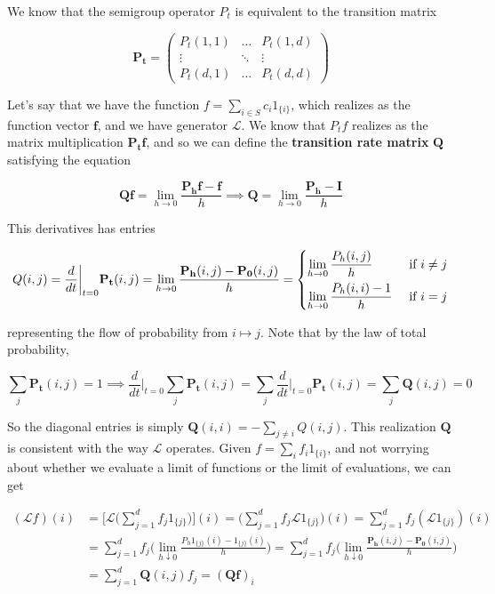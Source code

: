 \documentclass{article}
\begin{document}
    \begin{example}
      We know that the semigroup operator $P_t$ is equivalent to the transition matrix 

        \[\mathbf{P_t} = \begin{pmatrix} P_t (1, 1) & \ldots & P_t (1, d) \\ \vdots & \ddots & \vdots \\ P_t (d, 1) & \ldots & P_t (d, d) \end{pmatrix}\]

      Let's say that we have the function $f = \sum_{i \in S} c_i 1_{\{i\}}$, which realizes as the function vector $\mathbf{f}$, and we have generator $\mathscr{L}$. We know that $P_t f$ realizes as the matrix multiplication $\mathbf{P_t} \mathbf{f}$, and so we can define the \textbf{transition rate matrix} $\mathbf{Q}$ satisfying the equation 

        \[\mathbf{Q} \mathbf{f}= \lim_{h \rightarrow 0} \frac{\mathbf{P_h} \mathbf{f} - \mathbf{f}}{h} \implies \mathbf{Q} = \lim_{h \rightarrow 0} \frac{\mathbf{P_h} - \mathbf{I}}{h}\]

      This derivatives has entries 

        \[Q(i, j) = \frac{d}{dt} \bigg|_{t = 0} \mathbf{P_t} (i, j) = \lim_{h \rightarrow 0} \frac{\mathbf{P_h} (i, j) - \mathbf{P_0} (i, j)}{h} = \begin{dcases} \lim_{h \rightarrow 0} \frac{P_h (i, j)}{h} & \text{ if } i \neq j \\ \lim_{h \rightarrow 0} \frac{P_h (i, i) - 1}{h} & \text{ if } i = j \end{dcases}\]

      representing the flow of probability from $i \mapsto j$. Note that by the law of total probability, 

        \[\sum_j \mathbf{P_t} (i, j) = 1 \implies \frac{d}{dt} \bigg|_{t = 0} \sum_{j} \mathbf{P_t} (i, j) =  \sum_j \frac{d}{dt} \bigg|_{t = 0} \mathbf{P_t} (i, j) = \sum_{j} \mathbf{Q} (i, j) = 0\]

      So the diagonal entries is simply $\mathbf{Q}(i, i) = - \sum_{j \neq i} Q(i, j)$. This realization $\mathbf{Q}$ is consistent with the way $\mathscr{L}$ operates. Given $f = \sum_i f_i 1_{\{i\}}$, and not worrying about whether we evaluate a limit of functions or the limit of evaluations, we can get 

      \begin{align*}
        (\mathscr{L} f) (i) & = \bigg[ \mathscr{L} \bigg( \sum_{j=1}^d f_j 1_{\{j\}} \bigg) \bigg] (i) = \bigg( \sum_{j=1}^d f_j \mathscr{L} 1_{\{j\}} \bigg) (i) = \sum_{j=1}^d f_j ( \mathscr{L} 1_{\{j\}}) (i) \\ 
        & = \sum_{j=1}^d f_j \bigg( \lim_{h \downarrow 0} \frac{P_h 1_{\{ j\}} (i) - 1_{\{j\}} (i)}{h} \bigg) = \sum_{j=1}^d f_j \bigg( \lim_{h \downarrow 0} \frac{\mathbf{P_h} (i, j) - \mathbf{P_0} (i, j)}{h} \bigg) \\
        & = \sum_{j=1}^d \mathbf{Q}(i, j) f_j = (\mathbf{Q} \mathbf{f})_i 
      \end{align*}


\end{example}
\end{document}
